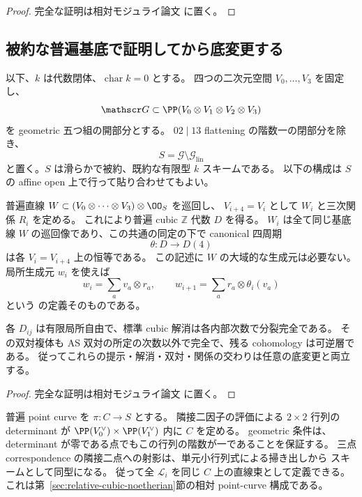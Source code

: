 \begin{proof}
完全な証明は相対モジュライ論文 \cite[\texttt{relative_picard_roots}]{QuadricModuli2026} に置く。
\end{proof}

\subsection{被約な普遍基底で証明してから底変更する}

以下、$k$ は代数閉体、$\operatorname{char}k=0$ とする。
四つの二次元空間 $V_0,\ldots,V_3$ を固定し、
\[
 \mathscr G\subset\PP(V_0\otimes V_1\otimes V_2\otimes V_3)
\]
を geometric 五つ組の開部分とする。
$02\mid13$ flattening の階数一の閉部分を除き、
\[
 S=\mathscr G\setminus\mathscr G_{\mathrm{lin}}
\]
と置く。$S$ は滑らかで被約、既約な有限型 $k$ スキームである。
以下の構成は $S$ の affine open 上で行って貼り合わせてもよい。

普遍直線 $W\subset(V_0\otimes\cdots\otimes V_3)\otimes\OO_S$ を巡回し、
$V_{i+4}=V_i$ として $W_i$ と三次関係 $R_i$ を定める。
これにより普遍 cubic $\mathbb Z$ 代数 $D$ を得る。
$W_i$ は全て同じ基底線 $W$ の巡回像であり、この共通の同定の下で
canonical 四周期
\[
 \theta:D\longrightarrow D(4)
 \tag{PR-2}\label{eq:theta}
\]
は各 $V_i=V_{i+4}$ 上の恒等である。
この記述に $W$ の大域的な生成元は必要ない。
局所生成元 $w_i$ を使えば
\[
 w_i=\sum_a v_a\otimes r_a,
 \qquad w_{i+1}=\sum_a r_a\otimes\theta_i(v_a)
\]
という \cite[\S5.2]{VdB2011} の定義そのものである。

\begin{lemma}[普遍族の次数別平坦性]\label{lem:universal-flatness}
各 $D_{ij}$ は有限局所自由で、標準 cubic 解消は各内部次数で分裂完全である。
その双対複体も AS 双対の所定の次数以外で完全で、残る cohomology は可逆層である。
従ってこれらの提示・解消・双対・関係の交わりは任意の底変更と両立する。
\end{lemma}

\begin{proof}
完全な証明は相対モジュライ論文 \cite[\texttt{relative_picard_roots}]{QuadricModuli2026} に置く。
\end{proof}

普遍 point curve を $\pi:C\to S$ とする。
隣接二因子の評価による $2\times2$ 行列の determinant が
$\PP(V_0^\vee)\times\PP(V_1^\vee)$ 内に $C$ を定める。
geometric 条件は、determinant が零である点でもこの行列の階数が一であることを保証する。
三点 correspondence の隣接二点への射影は、単元小行列式による掃き出しから
スキームとして同型になる。
従って全 $\mathcal L_i$ を同じ $C$ 上の直線束として定義できる。
これは第~\ref{sec:relative-cubic-noetherian}節の相対 point-curve 構成である。

